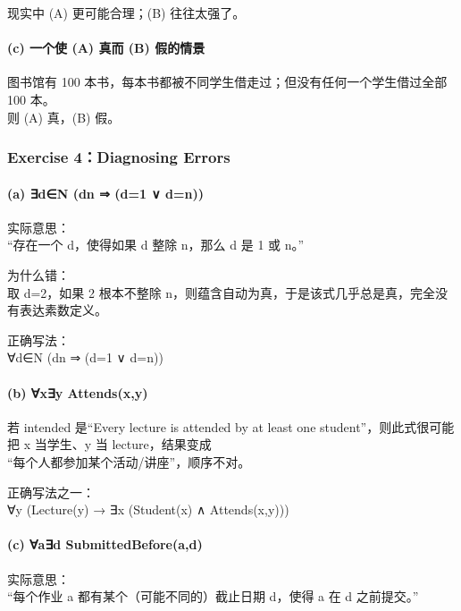 \documentclass[
  11pt,
]{article}
\begin{document}
现实中 (A) 更可能合理；(B) 往往太强了。

\paragraph{(c) 一个使 (A) 真而 (B)
假的情景}\label{c-ux4e00ux4e2aux4f7f-a-ux771fux800c-b-ux5047ux7684ux60c5ux666f}

图书馆有 100 本书，每本书都被不同学生借走过；但没有任何一个学生借过全部
100 本。\\
则 (A) 真，(B) 假。

\subsubsection{Exercise 4：Diagnosing
Errors}\label{exercise-4diagnosing-errors}

\paragraph{(a) ∃d∈N (d\textbar n ⇒ (d=1 ∨ d=n))}\label{a-dn-dn-d1-dn}

实际意思：\\
``存在一个 d，使得如果 d 整除 n，那么 d 是 1 或 n。''

为什么错：\\
取 d=2，如果 2 根本不整除
n，则蕴含自动为真，于是该式几乎总是真，完全没有表达素数定义。

正确写法：\\
∀d∈N (d\textbar n ⇒ (d=1 ∨ d=n))

\paragraph{(b) ∀x∃y Attends(x,y)}\label{b-xy-attendsxy}

若 intended 是``Every lecture is attended by at least one
student''，则此式很可能把 x 当学生、y 当 lecture，结果变成\\
``每个人都参加某个活动/讲座''，顺序不对。

正确写法之一：\\
∀y (Lecture(y) → ∃x (Student(x) ∧ Attends(x,y)))

\paragraph{(c) ∀a∃d SubmittedBefore(a,d)}\label{c-ad-submittedbeforead}

实际意思：\\
``每个作业 a 都有某个（可能不同的）截止日期 d，使得 a 在 d 之前提交。''
\end{document}
